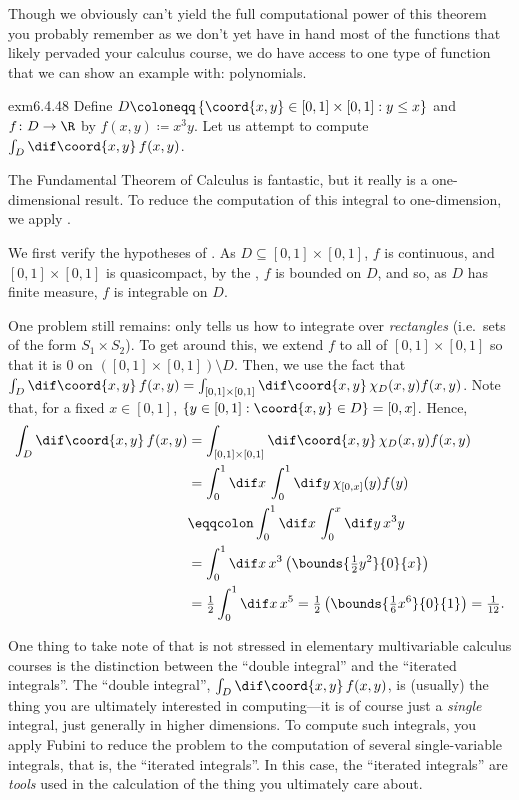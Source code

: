 Though we obviously can't yield the full computational power of this theorem you probably remember as we don't yet have in hand most of the functions that likely pervaded your calculus course, we do have access to one type of function that we can show an example with:  polynomials.
\begin{exm}{}{exm6.4.48}
Define $D\coloneqq \left\{ \coord{x,y}\in [0,1]\times [0,1]:y\leq x\right\}$ and $f\colon D\rightarrow \R$ by $f(x,y)\coloneqq x^3y$.  Let us attempt to compute $\int _D\dif \coord{x,y}\, f(x,y)$.

The Fundamental Theorem of Calculus is fantastic, but it really is a one-dimensional result.  To reduce the computation of this integral to one-dimension, we apply .

We first verify the hypotheses of .  As $D\subseteq [0,1]\times [0,1]$, $f$ is continuous, and $[0,1]\times [0,1]$ is quasicompact, by the , $f$ is bounded on $D$, and so, as $D$ has finite measure, $f$ is integrable on $D$.

One problem still remains:   only tells us how to integrate over \emph{rectangles} (i.e.~sets of the form $S_1\times S_2$).  To get around this, we extend $f$ to all of $[0,1]\times [0,1]$ so that it is $0$ on $([0,1]\times [0,1])\setminus D$.  Then, we use the fact that $\int _D\dif \coord{x,y}\, f(x,y)=\int _{[0,1]\times [0,1]}\dif \coord{x,y}\, \chi _D(x,y)f(x,y)$.  Note that, for a fixed $x\in [0,1]$, $\left\{ y\in [0,1]:\coord{x,y}\in D\right\} =[0,x]$.  Hence,
\begin{equation}
\begin{split}
\int _D\dif \coord{x,y}\, f(x,y) & =\int _{[0,1]\times [0,1]}\dif \coord{x,y}\, \chi _D(x,y)f(x,y) \\
& =\int _0^1\dif x\, \int _0^1\dif y\, \chi _{[0,x]}(y)f(y) \\
& \eqqcolon \int _0^1\dif x\, \int _0^x\dif y\, x^3y \\
& =\int _0^1\dif x\, x^3\left( \bounds{\tfrac{1}{2}y^2}{0}{x}\right) \\
& =\tfrac{1}{2}\int _0^1\dif x\, x^5=\tfrac{1}{2}\left( \bounds{\tfrac{1}{6}x^6}{0}{1}\right) =\tfrac{1}{12}.
\end{split}
\end{equation}
\begin{rmk}
One thing to take note of that is not stressed in elementary multivariable calculus courses is the distinction between the ``double integral'' and the ``iterated integrals''.  The ``double integral'', $\int _D\dif \coord{x,y}\, f(x,y)$, is (usually) the thing you are ultimately interested in computing---it is of course just a \emph{single} integral, just generally in higher dimensions.  To compute such integrals, you apply Fubini to reduce the problem to the computation of several single-variable integrals, that is, the ``iterated integrals''.  In this case, the ``iterated integrals'' are \emph{tools} used in the calculation of the thing you ultimately care about.
\end{rmk}
\end{exm}

